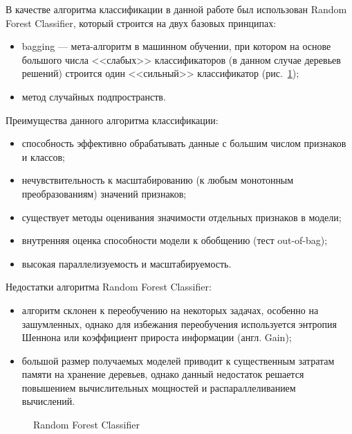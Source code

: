 В качестве алгоритма классификации в данной работе был использован Random Forest Classifier, который строится на двух базовых принципах: 
\begin{itemize}
  \item bagging --- мета-алгоритм в машинном обучении, при котором на основе большого числа <<слабых>> классификаторов (в данном случае деревьев решений) строится один <<сильный>> классификатор (рис.~\ref{forest:forest});
  \item метод случайных подпространств.
\end{itemize}

Преимущества данного алгоритма классификации:
\begin{itemize}
  \item способность эффективно обрабатывать данные с большим числом признаков и классов;
  \item нечувствительность к масштабированию (к любым монотонным преобразованиям) значений признаков;
  \item существует методы оценивания значимости отдельных признаков в модели;
  \item внутренняя оценка способности модели к обобщению (тест out-of-bag);
  \item высокая параллелизуемость и масштабируемость.
\end{itemize}

Недостатки алгоритма Random Forest Classifier:
\begin{itemize}
  \item алгоритм склонен к переобучению на некоторых задачах, особенно на зашумленных, однако для избежания переобучения используется энтропия Шеннона или коэффициент прироста информации (англ. Gain);
  \item большой размер получаемых моделей приводит к существенным затратам памяти на хранение деревьев, однако данный недостаток решается повышением вычислительных мощностей и распараллеливанием вычислений.~\cite{random_forest}
\end{itemize}

\begin{figure}[h!]
\caption{ Random Forest Classifier }
\label{forest:forest}
\end{figure} 

